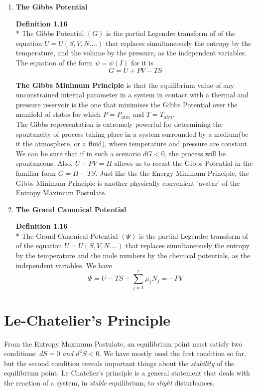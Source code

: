 \documentclass[oneside]{book}
\begin{document}
\begin{enumerate}
	\item \textbf{The Gibbs Potential}
	\begin{mdframed}[style=exercise]
		\textbf{Definition 1.16}
 \\* The Gibbs Potential $(G)$ is the partial Legendre transform of of the equation $U = U(S,V,N....)$ that replaces simultaneously the entropy by the temperature, and the volume by the pressure,  as the independent variables. The equation of the form $\psi = \psi(I)$ for it is 
 \[G = U + PV -TS\]
\end{mdframed}
\textbf{The Gibbs Minimum Principle} is that the equilibrium value of any unconstrained internal parameter in a system in contact with a thermal and pressure reservoir is the one that minimises the Gibbs Potential over the manifold of states for which $P = P_{atm}$ and $T = T_{atm}$.\\
The Gibbs representation is extremely powerful for determining the spontaneity of process taking place in a system surrounded by a medium(be it the atmosphere, or a fluid), where temperature and pressure are constant. We can be sure that if in such a scenario $dG<0$, the process will be spontaneous. Also, $U + PV = H$ allows us to recast the Gibbs Potential in the familiar form $G = H - TS$. Just like the the Energy Minimum Principle, the Gibbs Minimum Principle is another physically convenient 'avatar' of the Entropy Maximum Postulate. 

	\item \textbf{The Grand Canonical Potential}
	\begin{mdframed}[style=exercise]
			\textbf{Definition 1.16}
 \\* The Grand Canonical Potential $(\Psi)$ is the partial Legendre transform of of the equation $U = U(S,V,N....)$ that replaces simultaneously the entropy by the temperature and the mole numbers by the chemical potentials, as the independent variables. We have
 \[\Psi = U - TS - \sum_{j = 1}^{r} \mu_j N_j = -PV\]
\end{mdframed}	
\end{enumerate}

\section{Le-Chatelier's Principle}
From the Entropy Maximum Postulate, an equilibrium point must satisfy two conditions: $dS =0$ \emph{and} $d^2S < 0$. We have mostly used the first condition so far, but the second condition reveals important things about the \emph{stability} of the equilibrium point. Le Chatelier's principle is a general statement that deals with the reaction of a system, in \emph{stable} equilibrium, to \emph{slight} disturbances. \\
\end{document}
